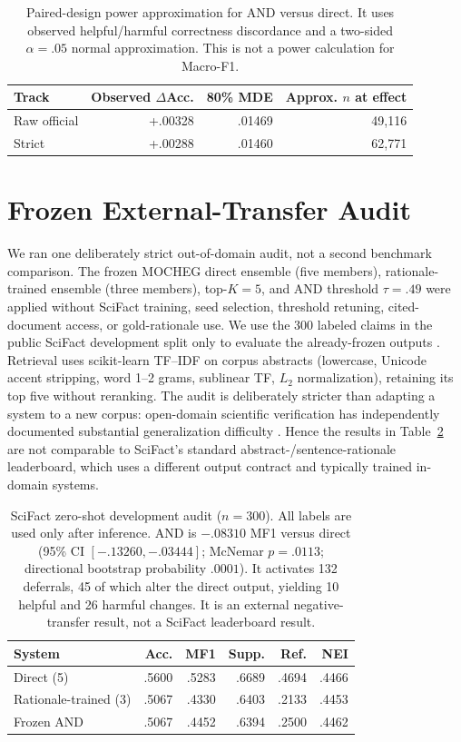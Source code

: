 \documentclass[11pt]{article}
\begin{document}
\begin{table}[t]
\centering\scriptsize
\begin{tabular}{@{}lrrr@{}}
\toprule
Track & Observed $\Delta$Acc. & 80\% MDE & Approx. $n$ at effect\\
\midrule
Raw official & +.00328 & .01469 & 49,116\\
Strict & +.00288 & .01460 & 62,771\\
\bottomrule
\end{tabular}
\caption{Paired-design power approximation for AND versus direct. It uses observed helpful/harmful correctness discordance and a two-sided $\alpha=.05$ normal approximation. This is not a power calculation for Macro-F1.}\label{tab:paired-power}
\end{table}

\section{Frozen External-Transfer Audit}\label{app:external-transfer}
We ran one deliberately strict out-of-domain audit, not a second benchmark comparison. The frozen MOCHEG direct ensemble (five members), rationale-trained ensemble (three members), top-$K=5$, and AND threshold $\tau=.49$ were applied without SciFact training, seed selection, threshold retuning, cited-document access, or gold-rationale use. We use the 300 labeled claims in the public SciFact development split only to evaluate the already-frozen outputs \citep{wadden2020scifact}. Retrieval uses scikit-learn TF--IDF on corpus abstracts (lowercase, Unicode accent stripping, word 1--2 grams, sublinear TF, $L_2$ normalization), retaining its top five without reranking. The audit is deliberately stricter than adapting a system to a new corpus: open-domain scientific verification has independently documented substantial generalization difficulty \citep{wadden2022scifactopen}. Hence the results in Table~\ref{tab:scifact-transfer} are not comparable to SciFact's standard abstract-/sentence-rationale leaderboard, which uses a different output contract and typically trained in-domain systems.

\begin{table}[t]
\centering\scriptsize
\begin{tabular}{@{}lrrrrr@{}}
\toprule
System & Acc. & MF1 & Supp. & Ref. & \textsc{NEI}\\
\midrule
Direct (5) & .5600 & .5283 & .6689 & .4694 & .4466\\
Rationale-trained (3) & .5067 & .4330 & .6403 & .2133 & .4453\\
Frozen AND & .5067 & .4452 & .6394 & .2500 & .4462\\
\bottomrule
\end{tabular}
\caption{SciFact zero-shot development audit ($n=300$). All labels are used only after inference. AND is $-.08310$ MF1 versus direct (95\% CI $[-.13260,-.03444]$; McNemar $p=.0113$; directional bootstrap probability $.0001$). It activates 132 deferrals, 45 of which alter the direct output, yielding 10 helpful and 26 harmful changes. It is an external negative-transfer result, not a SciFact leaderboard result.}\label{tab:scifact-transfer}
\end{table}
\end{document}
